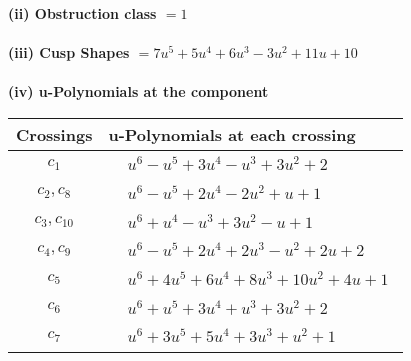 \documentclass[1p]{elsarticle_modified}
\theoremstyle{definition}
\begin{document}
\flushleft \textbf{(ii) Obstruction class $= 1$}\\~\\
\flushleft \textbf{(iii) Cusp Shapes $= 7 u^5+5 u^4+6 u^3-3 u^2+11 u+10$}\\~\\
\newpage\renewcommand{\arraystretch}{1}
\flushleft \textbf{(iv) u-Polynomials at the component}\newline \\
\begin{tabular}{m{50pt}|m{274pt}}
Crossings & \hspace{64pt}u-Polynomials at each crossing \\
\hline $$\begin{aligned}c_{1}\end{aligned}$$&$\begin{aligned}
&u^6- u^5+3 u^4- u^3+3 u^2+2
\end{aligned}$\\
\hline $$\begin{aligned}c_{2},c_{8}\end{aligned}$$&$\begin{aligned}
&u^6- u^5+2 u^4-2 u^2+u+1
\end{aligned}$\\
\hline $$\begin{aligned}c_{3},c_{10}\end{aligned}$$&$\begin{aligned}
&u^6+u^4- u^3+3 u^2- u+1
\end{aligned}$\\
\hline $$\begin{aligned}c_{4},c_{9}\end{aligned}$$&$\begin{aligned}
&u^6- u^5+2 u^4+2 u^3- u^2+2 u+2
\end{aligned}$\\
\hline $$\begin{aligned}c_{5}\end{aligned}$$&$\begin{aligned}
&u^6+4 u^5+6 u^4+8 u^3+10 u^2+4 u+1
\end{aligned}$\\
\hline $$\begin{aligned}c_{6}\end{aligned}$$&$\begin{aligned}
&u^6+u^5+3 u^4+u^3+3 u^2+2
\end{aligned}$\\
\hline $$\begin{aligned}c_{7}\end{aligned}$$&$\begin{aligned}
&u^6+3 u^5+5 u^4+3 u^3+u^2+1
\end{aligned}$\\
\hline
\end{tabular}\\~\\
\end{document}
